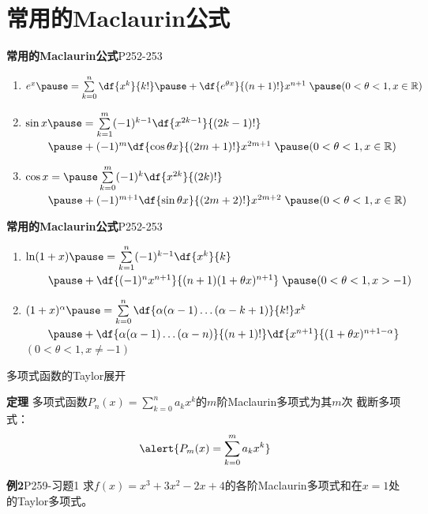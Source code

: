 \section{常用的Maclaurin公式}

\begin{frame}
	\linespread{1.5}
	\begin{block}{{\bf 常用的Maclaurin公式}\hfill P252-253}\pause 
		\begin{enumerate}
		  \item \alert{$e^x\pause =\sum\limits_{k=0}^n\df{x^k}{k!}\pause
		  +\df{e^{\theta x}}{(n+1)!}x^{n+1}\;\pause
		  (0<\theta<1,x\in\mathbb{R})$}\pause
		  \item \alert{$\sin x\pause
		  =\sum\limits_{k=1}^m(-1)^{k-1}\df{x^{2k-1}}{(2k-1)!}$\\ $\quad\quad \pause
		  +(-1)^m\df{\cos\theta x}{(2m+1)!}x^{2m+1}\;\pause
		  (0<\theta<1,x\in\mathbb{R})$}\pause
		  \item \alert{$\cos x=\pause \sum\limits_{k=0}^m(-1)^{k}\df{x^{2k}}{(2k)!}$\\
		  $\quad\quad \pause +(-1)^{m+1}\df{\sin\theta
		  x}{(2m+2)!}x^{2m+2}\;\pause (0<\theta<1,x\in\mathbb{R})$}
		\end{enumerate}
	\end{block}
\end{frame}

\begin{frame}
	\linespread{2}
	\begin{block}{{\bf 常用的Maclaurin公式}\hfill P252-253}
		\begin{enumerate}\pause 
		  \addtocounter{enumi}{3}
		  \item
		  \alert{$\ln(1+x)\pause =\sum\limits_{k=1}^n(-1)^{k-1}\df{x^k}{k}$\\
		  $\quad\quad \pause +\df{(-1)^nx^{n+1}}{(n+1)(1+\theta
		  x)^{n+1}}\;\pause (0<\theta<1,x>-1)$}\pause 
		  \item
		  \alert{$(1+x)^\alpha\pause =\sum\limits_{k=0}^n
		  \df{\alpha(\alpha-1)\ldots(\alpha-k+1)}{k!}x^k$\\
			$\quad\quad
			\pause +\df{\alpha(\alpha-1)\ldots(\alpha-n)}{(n+1)!}\df{x^{n+1}}{(1+\theta
			x)^{n+1-\alpha}}$\\
			\hfill \pause $(0<\theta<1,x\ne -1)$}
		\end{enumerate}
	\end{block}
\end{frame}

\begin{frame}{多项式函数的Taylor展开}
	\linespread{1.2}\pause 
	\begin{alertblock}{{\bf 定理}\hfill}
		多项式函数$P_n(x)=\sum\limits_{k=0}^na_kx^k$的$m$阶Maclaurin多项式为其$m$次{\bb
		截断多项式：}\pause 
		$$\alert{P_m(x)=\sum\limits_{k=0}^ma_kx^k}$$
	\end{alertblock}\pause 
	\begin{exampleblock}{{\bf 例2}\hfill P259-习题1}
		求$f(x)=x^3+3x^2-2x+4$的各阶Maclaurin多项式和在$x=1$处的Taylor多项式。
	\end{exampleblock}
\end{frame}


